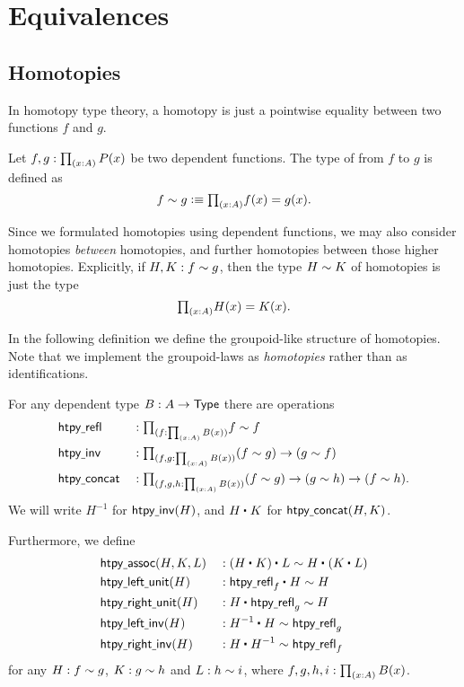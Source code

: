 \chapter{Equivalences}

\section{Homotopies}
In homotopy type theory, a homotopy is just a pointwise equality between two functions $f$ and $g$.

\begin{defn}
Let $f,g:\prd{x:A}P(x)$ be two dependent functions. The type of  from $f$ to $g$ is defined as
\begin{equation*}
f\htpy g \defeq \prd{x:A} f(x)=g(x).
\end{equation*}
\end{defn}

Since we formulated homotopies using dependent functions, we may also consider homotopies \emph{between} homotopies, and further homotopies between those higher homotopies. 
Explicitly, if $H,K:f\sim g$, then the type $H\sim K$ of homotopies is just the type
\begin{equation*}
\prd{x:A} H(x)=K(x).
\end{equation*}

In the following definition we define the groupoid-like structure of homotopies. Note that we implement the groupoid-laws as \emph{homotopies} rather than as identifications.

\begin{defn}\label{defn:htpy_groupoid}
For any dependent type $B:A\to\mathsf{Type}$ there are operations
\begin{align*}
& \mathsf{htpy\usc{}refl} & & : \prd{f:\prd{x:A}B(x)}f\htpy f \\
& \mathsf{htpy\usc{}inv} & & : \prd*{f,g:\prd{x:A}B(x)} (f\htpy g)\to(g\htpy f) \\
& \mathsf{htpy\usc{}concat} & & : \prd*{f,g,h:\prd{x:A}B(x)} (f\htpy g)\to (g\htpy h)\to (f\htpy h).
\end{align*}
We will write $H^{-1}$ for $\mathsf{htpy\underline{\ }{}inv}(H)$, and $\ct{H}{K}$ for $\mathsf{htpy\underline{\ }{}concat}(H,K)$. 

Furthermore, we define
\begin{align*}
& \mathsf{htpy\usc{}assoc}(H,K,L) & & : \ct{(\ct{H}{K})}{L}\htpy\ct{H}{(\ct{K}{L})} \\
& \mathsf{htpy\usc{}left\usc{}unit}(H) & & : \ct{\mathsf{htpy\usc{}refl}_f}{H}\htpy H \\
& \mathsf{htpy\usc{}right\usc{}unit}(H) & & : \ct{H}{\mathsf{htpy\usc{}refl}_g}\htpy H \\
& \mathsf{htpy\usc{}left\usc{}inv}(H) & & : \ct{H^{-1}}{H} \htpy \mathsf{htpy\usc{}refl}_g \\
& \mathsf{htpy\usc{}right\usc{}inv}(H) & & : \ct{H}{H^{-1}} \htpy \mathsf{htpy\usc{}refl}_f
\end{align*}
for any $H:f\sim g$, $K:g\sim h$ and $L:h\sim i$, where $f,g,h,i:\prd{x:A}B(x)$.
\end{defn}

